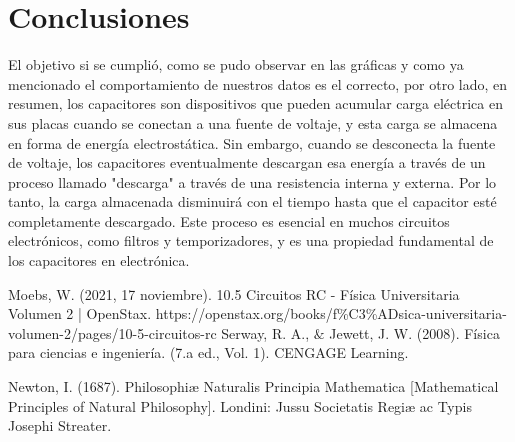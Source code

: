 \documentclass{article}
\begin{document}
\section{Conclusiones}\label{Conclusiones}				%
El objetivo si se cumplió, como se pudo observar en las gráficas y como ya mencionado el comportamiento de nuestros datos es el correcto, por otro lado,
en resumen, los capacitores son dispositivos que pueden acumular carga eléctrica en sus placas cuando se conectan a una fuente de voltaje, y esta carga se almacena en forma de energía electrostática. Sin embargo, cuando se desconecta la fuente de voltaje, los capacitores eventualmente descargan esa energía a través de un proceso llamado "descarga" a través de una resistencia interna y externa. Por lo tanto, la carga almacenada disminuirá con el tiempo hasta que el capacitor esté completamente descargado. Este proceso es esencial en muchos circuitos electrónicos, como filtros y temporizadores, y es una propiedad fundamental de los capacitores en electrónica.


\begin{thebibliography}{9}						%
 Moebs, W. (2021, 17 noviembre). 10.5 Circuitos RC - Física Universitaria Volumen 2 | OpenStax. https://openstax.org/books/f\%C3\%ADsica-universitaria-volumen-2/pages/10-5-circuitos-rc
	Serway, R. A., $\&$ Jewett, J. W. (2008). Física para ciencias e ingeniería. (7.a
ed., Vol. 1). CENGAGE Learning.

	Newton, I. (1687). Philosophiæ Naturalis Principia Mathematica [Mathematical Principles of Natural Philosophy]. Londini: Jussu Societatis Regiæ ac Typis Josephi Streater.

\end{thebibliography}
\end{document}
